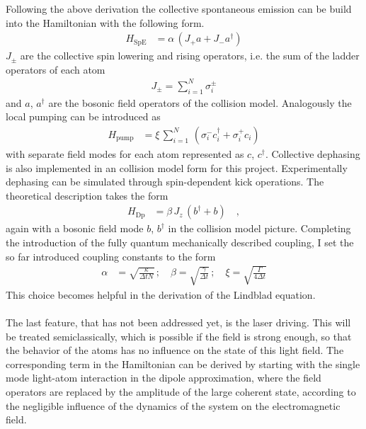 Following the above derivation the collective spontaneous emission can be build into the Hamiltonian with the following form.
\begin{align*}
    H_\text{SpE}&=\alpha\,(J_+a + J_-a^\dagger)
\end{align*}
$J_\pm$ are the collective spin lowering and rising operators, i.e. the sum of the ladder operators of each atom 
\begin{align*}
    J_\pm=\sum_{i=1}^N\sigma^\pm_i
\end{align*}
and $a$, $a^\dagger$ are the bosonic field operators of the collision model. Analogously the local pumping can be introduced as
\begin{align*}
    H_\text{pump}&=\xi\,\sum_{i=1}^N\,(\sigma_i^-c_i^\dagger+\sigma_i^+c_i)
\end{align*}
with separate field modes for each atom represented as $c$, $c^\dagger$. Collective dephasing is also implemented in an collision model form for this project. %
Experimentally dephasing can be simulated through spin-dependent kick operations\cite{sun_quantum_2024}. The theoretical description takes the form %
\begin{align*}
    H_\text{Dp}&=\beta\,J_z\,(b^\dagger+b)\quad,
\end{align*}
again with a bosonic field mode $b$, $b^\dagger$ in the collision model picture. Completing the introduction of the fully quantum mechanically described coupling, I set the so far introduced coupling constants to the form
\begin{align}
    \alpha&=\sqrt{\frac{\kappa}{\Delta tN}}\,;\quad \beta=\sqrt{\frac{\gamma}{\Delta t}}\,;\quad \xi=\sqrt{\frac{\Gamma}{4\Delta t}}
\end{align}
This choice becomes helpful in the derivation of the Lindblad equation.\\\\
The last feature, that has not been addressed yet, is the laser driving. This will be treated semiclassically, which is possible if the field is strong enough, so that the behavior of the atoms has no influence on the state of this light field. The corresponding term in the Hamiltonian can be derived by starting with the single mode light-atom interaction in the dipole approximation, where the field operators are replaced by the amplitude of the large coherent state, according to the negligible influence of the dynamics of the system on the electromagnetic field. 
